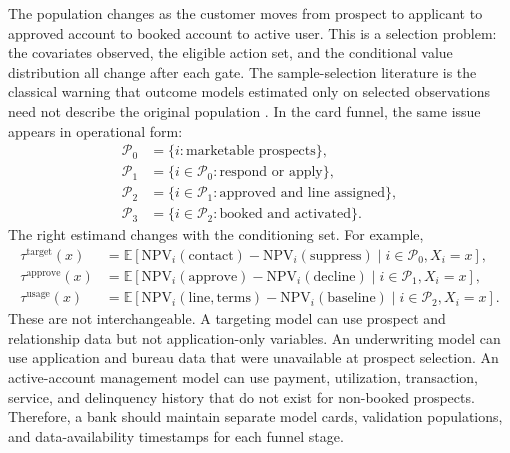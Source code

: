 \documentclass[11pt]{article}
\newcommand{\E}{\mathbb{E}}
\newcommand{\NPV}{\mathrm{NPV}}
\newcommand{\1}{\mathbf{1}}
\begin{document}
The population changes as the customer moves from prospect to applicant to
approved account to booked account to active user. This is a selection problem:
the covariates observed, the eligible action set, and the conditional value
distribution all change after each gate. The sample-selection literature is the
classical warning that outcome models estimated only on selected observations
need not describe the original population \citep{heckman1979selection}. In the
card funnel, the same issue appears in operational form:
\begin{align}
  \mathcal{P}_0 &= \{i:\text{marketable prospects}\},\\
  \mathcal{P}_1 &= \{i\in\mathcal{P}_0:\text{respond or apply}\},\\
  \mathcal{P}_2 &= \{i\in\mathcal{P}_1:\text{approved and line assigned}\},\\
  \mathcal{P}_3 &= \{i\in\mathcal{P}_2:\text{booked and activated}\}.
  \label{eq:funnel-populations}
\end{align}
The right estimand changes with the conditioning set. For example,
\begin{align}
  \tau^{\mathrm{target}}(x)
    &= \E[\NPV_i(\mathrm{contact})-\NPV_i(\mathrm{suppress})
        \mid i\in\mathcal{P}_0,X_i=x],\\
  \tau^{\mathrm{approve}}(x)
    &= \E[\NPV_i(\mathrm{approve})-\NPV_i(\mathrm{decline})
        \mid i\in\mathcal{P}_1,X_i=x],\\
  \tau^{\mathrm{usage}}(x)
    &= \E[\NPV_i(\mathrm{line},\mathrm{terms})-\NPV_i(\mathrm{baseline})
        \mid i\in\mathcal{P}_2,X_i=x].
  \label{eq:funnel-estimands}
\end{align}
These are not interchangeable. A targeting model can use prospect and
relationship data but not application-only variables. An underwriting model can
use application and bureau data that were unavailable at prospect selection.
An active-account management model can use payment, utilization, transaction,
service, and delinquency history that do not exist for non-booked prospects.
Therefore, a bank should maintain separate model cards, validation populations,
and data-availability timestamps for each funnel stage.
\end{document}
